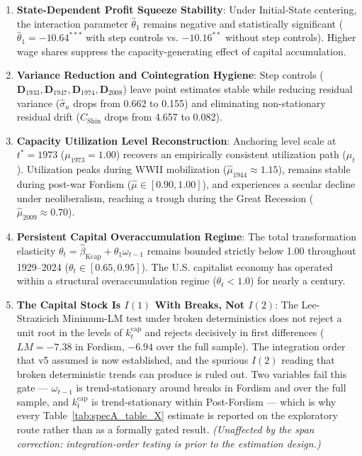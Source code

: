 \documentclass[11pt,a4paper]{article}
\begin{document}
\begin{enumerate}
    \item \textbf{State-Dependent Profit Squeeze Stability}: Under Initial-State centering, the interaction parameter $\hat{\theta}_1$ remains negative and statistically significant ($\hat{\theta}_1 = -10.64^{***}$ with step controls vs. $-10.16^{**}$ without step controls). Higher wage shares suppress the capacity-generating effect of capital accumulation.
    \item \textbf{Variance Reduction and Cointegration Hygiene}: Step controls ($\mathbf{D}_{1933}, \mathbf{D}_{1947}, \mathbf{D}_{1974}, \mathbf{D}_{2008}$) leave point estimates stable while reducing residual variance ($\hat{\sigma}_u$ drops from 0.662 to 0.155) and eliminating non-stationary residual drift ($C_{\text{Shin}}$ drops from 4.657 to 0.082).
    \item \textbf{Capacity Utilization Level Reconstruction}: Anchoring level scale at $t^* = 1973$ ($\mu_{1973} = 1.00$) recovers an empirically consistent utilization path ($\hat{\mu}_t$). Utilization peaks during WWII mobilization ($\hat{\mu}_{1944} \approx 1.15$), remains stable during post-war Fordism ($\hat{\mu} \in [0.90, 1.00]$), and experiences a secular decline under neoliberalism, reaching a trough during the Great Recession ($\hat{\mu}_{2009} \approx 0.70$).
    \item \textbf{Persistent Capital Overaccumulation Regime}: The total transformation elasticity $\theta_t = \hat{\beta}_{\text{Kcap}} + \hat{\theta}_1 \omega_{t-1}$ remains bounded strictly below 1.00 throughout 1929--2024 ($\theta_t \in [0.65, 0.95]$). The U.S. capitalist economy has operated within a structural overaccumulation regime ($\theta_t < 1.0$) for nearly a century.
    \item \textbf{The Capital Stock Is $I(1)$ With Breaks, Not $I(2)$}: The Lee-Strazicich Minimum-LM test under broken deterministics does not reject a unit root in the levels of $k_t^{\text{cap}}$ and rejects decisively in first differences ($LM = -7.38$ in Fordism, $-6.94$ over the full sample). The integration order that v5 assumed is now established, and the spurious $I(2)$ reading that broken deterministic trends can produce is ruled out. Two variables fail this gate --- $\omega_{t-1}$ is trend-stationary around breaks in Fordism and over the full sample, and $k_t^{\text{cap}}$ is trend-stationary within Post-Fordism --- which is why every Table~\ref{tab:specA_table_X} estimate is reported on the exploratory route rather than as a formally gated result. \textit{(Unaffected by the span correction: integration-order testing is prior to the estimation design.)}

\end{enumerate}
\end{document}
